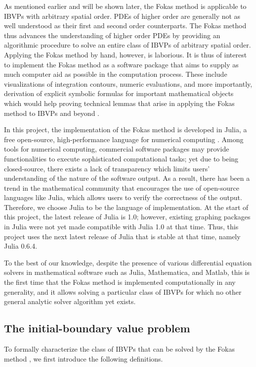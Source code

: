 \documentclass[12pt, oneside, a4paper]{article}
\begin{document}
As mentioned earlier and will be shown later, the Fokas method is applicable to IBVPs with arbitrary spatial order. PDEs of higher order are generally not as well understood as their first and second order counterparts. The Fokas method thus advances the understanding of higher order PDEs by providing an algorithmic procedure to solve an entire class of IBVPs of arbitrary spatial order. Applying the Fokas method by hand, however, is laborious. It is thus of interest to implement the Fokas method as a software package that aims to supply as much computer aid as possible in the computation process. These include visualizations of integration contours, numeric evaluations, and more importantly, derivation of explicit symbolic formulas for important mathematical objects which would help proving technical lemmas that arise in applying the Fokas method to IBVPs \cite{Smith2012} and beyond \cite{Miller2018}.

In this project, the implementation of the Fokas method is developed in Julia, a free open-source, high-performance language for numerical computing \cite{julia}. Among tools for numerical computing, commercial software packages may provide functionalities to execute sophisticated computational tasks; yet due to being closed-source, there exists a lack of transparency which limits users' understanding of the nature of the software output. As a result, there has been a trend in the mathematical community that encourages the use of open-source languages like Julia, which allows users to verify the correctness of the output. Therefore, we choose Julia to be the language of implementation. At the start of this project, the latest release of Julia is 1.0; however, existing graphing packages in Julia were not yet made compatible with Julia 1.0 at that time. Thus, this project uses the next latest release of Julia that is stable at that time, namely Julia 0.6.4. 

To the best of our knowledge, despite the presence of various differential equation solvers in mathematical software such as Julia, Mathematica, and Matlab, this is the first time that the Fokas method is implemented computationally in any generality, and it allows solving a particular class of IBVPs for which no other general analytic solver algorithm yet exists.

\subsection{The initial-boundary value problem}\label{sec:IBVP}
To formally characterize the class of IBVPs that can be solved by the Fokas method \cite[p.9]{Smith2016}, we first introduce the following definitions.
\end{document}
